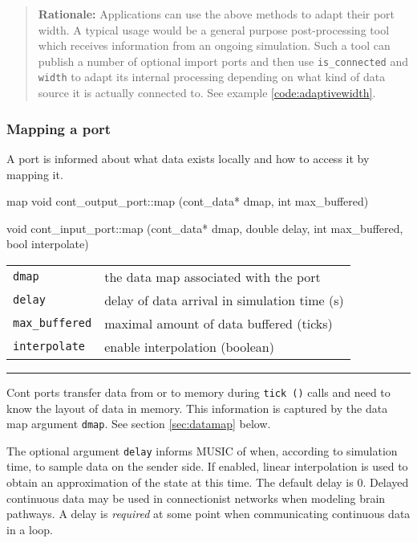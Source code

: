 \documentclass[a4paper]{report}
\makeatletter
\newenvironment{rationale}%
{\par\begin{quote}\textbf{Rationale:}}%
{\par\end{quote}}
\newenvironment{parameters}%
{\begin{tabular}{@{\hspace{2em}}lp{0.6\textwidth}}}%
{\end{tabular}\par\vspace{1mm}\par\hrule\par\vspace{5mm}}
\makeatother
\begin{document}
\begin{rationale}
  Applications can use the above methods to adapt their port width.  A
  typical usage would be a general purpose post-processing tool which
  receives information from an ongoing simulation.  Such a tool can
  publish a number of optional import ports and then use
  \lstinline|is_connected| and \lstinline|width| to adapt its internal
  processing depending on what kind of data source it is actually
  connected to.  See example \ref{code:adaptivewidth}.
\end{rationale}


\subsubsection{Mapping a port}

A port is informed about what data exists locally and how to access it
by mapping it.

\begin{head}{map}
  void cont_output_port::map (cont_data* dmap, int max_buffered)

  void cont_input_port::map (cont_data* dmap,
                             double delay,
                             int max_buffered,
                             bool interpolate)
\end{head}
\begin{parameters}
  \lstinline|dmap| & the data map associated with the port \\
  \lstinline|delay| & delay of data arrival in simulation time (s) \\
  \lstinline|max_buffered| & maximal amount of data buffered (ticks)
  \\
  \lstinline|interpolate| & enable interpolation (boolean) \\
\end{parameters}

Cont ports transfer data from or to memory during \lstinline|tick ()|
calls and need to know the layout of data in memory.  This information
is captured by the data map argument \lstinline|dmap|. See section
\ref{sec:datamap} below.

The optional argument \lstinline|delay| informs MUSIC of when,
according to simulation time, to sample data on the sender side.  If
enabled, linear interpolation is used to obtain an approximation of
the state at this time.  The default delay is 0.  Delayed continuous
data may be used in connectionist networks when modeling brain
pathways.  A delay is \emph{required} at some point when communicating
continuous data in a loop.
\end{document}
